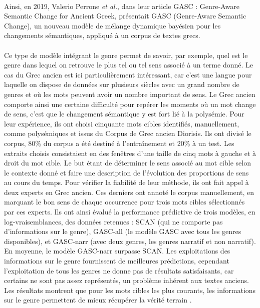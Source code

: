 \documentclass{article}
\begin{document}
\paragraph{}
Ainsi, en 2019, Valerio Perrone \textit{et al.}, dans leur article GASC : Genre-Aware Semantic Change for Ancient Greek, présentait GASC (Genre-Aware Semantic Change), un nouveau modèle de mélange dynamique bayésien pour les changements sémantiques, appliqué à un corpus de textes grecs.  
\paragraph{}
Ce type de modèle intégrant le genre permet de savoir, par exemple, quel est le genre dans lequel on retrouve le plus tel ou tel sens associé à un terme donné. Le cas du Grec ancien est ici particulièrement intéressant, car c’est une langue pour laquelle on dispose de données sur plusieurs siècles avec un grand nombre de genres et où les mots peuvent avoir un nombre important de sens. Le Grec ancien comporte ainsi une certaine difficulté pour repérer les moments où un mot change de sens, c’est que le changement sémantique y est fort lié à la polysémie. Pour leur expérience, ils ont choisi cinquante mots cibles identifiés, manuellement, comme polysémiques et issus du Corpus de Grec ancien Diorisis. Ils ont divisé le corpus, 80\% du corpus a été destiné à l’entraînement et 20\% à un test. Les extraits choisis consistaient en des fenêtres d’une taille de cinq mots à gauche et à droit du mot cible. Le but étant de déterminer le sens associé au mot cible selon le contexte donné et faire une description de l’évolution des proportions de sens au cours du temps. Pour vérifier la fiabilité de leur méthode, ils ont fait appel à deux experts en Grec ancien. Ces derniers ont annoté le corpus manuellement, en marquant le bon sens de chaque occurrence pour trois mots cibles sélectionnés par ces experts. Ils ont ainsi évalué la performance prédictive de trois modèles, en log-vraisemblances, des données retenues : SCAN (qui ne comporte pas d’informations sur le genre), GASC-all (le modèle GASC avec tous les genres disponibles), et GASC-narr (avec deux genres, les genres narratif et non narratif). En moyenne, le modèle GASC-narr surpasse SCAN. Les exploitations des informations sur le genre fournissent de meilleures prédictions, cependant l’exploitation de tous les genres ne donne pas de résultats satisfaisants, car certains ne sont pas assez représentés, un problème inhérent aux textes anciens. Les résultats montrent que pour les mots cibles les plus courants, les informations sur le genre permettent de mieux récupérer la vérité terrain \cite{perrone2019gasc}. 
\end{document}
